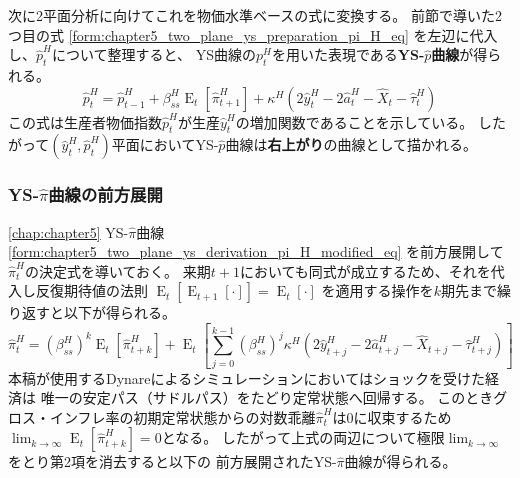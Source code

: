 次に2平面分析に向けてこれを物価水準ベースの式に変換する。
前節で導いた2つ目の式
\eqref{form:chapter5_two_plane_ys_preparation_pi_H_eq}
を左辺に代入し、\(\hat{p}_t^H\)について整理すると、
YS曲線の\(p_t^H\)を用いた表現である\textbf{YS-\(\hat{p}\)曲線}が得られる。
\begin{equation}
\label{form:chapter5_two_plane_ys_derivation_p_H_modified_eq}
    \hat{p}_t^H=\hat{p}_{t-1}^H+\beta_{ss}^H\operatorname{E}_t[\hat{\pi}_{t+1}^H]+\kappa^H(2\hat{y}_t^H-2\hat{a}_t^H-\hat{X}_t-\hat{\tau}_t^H)
\end{equation}
この式は生産者物価指数\(\hat{p}_t^H\)が生産\(\hat{y}_t^H\)の増加関数であることを示している。
したがって\((\hat{y}_t^H,\hat{p}_t^H)\)平面においてYS-\(\hat{p}\)曲線は\textbf{右上がり}の曲線として描かれる。

\subsubsection{YS-\(\hat{\pi}\)曲線の前方展開}
\label{sec:chapter5_two_plane_ys_forward}
\ref{chap:chapter5}
YS-\(\hat{\pi}\)曲線
\eqref{form:chapter5_two_plane_ys_derivation_pi_H_modified_eq}
を前方展開して\(\hat{\pi}_t^H\)の決定式を導いておく。
来期\(t+1\)においても同式が成立するため、それを代入し反復期待値の法則
\(\operatorname{E}_t[\operatorname{E}_{t+1}[\cdot]]=\operatorname{E}_t[\cdot]\)
を適用する操作を\(k\)期先まで繰り返すと以下が得られる。
\begin{equation}
\label{form:chapter5_two_plane_ys_forward_pi_H_k_eq}
    \hat{\pi}_t^H=(\beta_{ss}^H)^k\operatorname{E}_t[\hat{\pi}_{t+k}^H]+\operatorname{E}_t\left[\sum_{j=0}^{k-1}(\beta_{ss}^H)^j\kappa^H(2\hat{y}_{t+j}^H-2\hat{a}_{t+j}^H-\hat{X}_{t+j}-\hat{\tau}_{t+j}^H)\right]
\end{equation}
本稿が使用するDynareによるシミュレーションにおいてはショックを受けた経済は
唯一の安定パス（サドルパス）をたどり定常状態へ回帰する。
このときグロス・インフレ率の初期定常状態からの対数乖離\(\hat{\pi}_t^H\)は\(0\)に収束するため
\(\lim_{k\to\infty}\operatorname{E}_t[\hat{\pi}_{t+k}^H]=0\)となる。
したがって上式の両辺について極限\(\lim_{k\to\infty}\)をとり第2項を消去すると以下の
前方展開されたYS-\(\hat{\pi}\)曲線が得られる。
